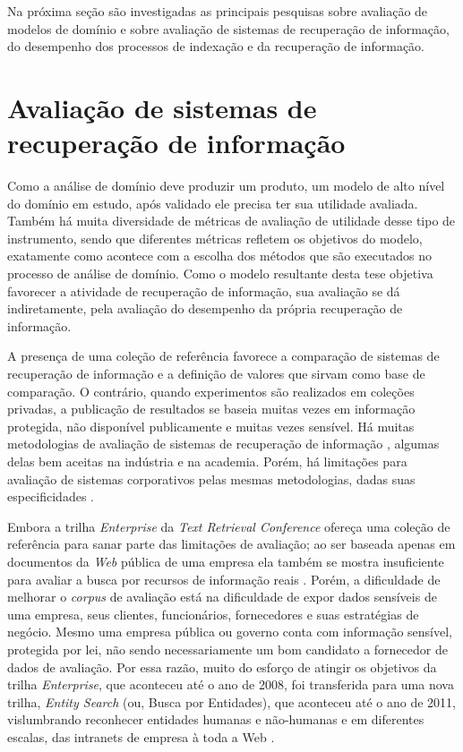 Na próxima seção são investigadas as principais pesquisas sobre avaliação de modelos de domínio e sobre avaliação de sistemas  de recuperação de informação, do desempenho dos processos de indexação e da recuperação de informação.


\section{Avaliação de sistemas de recuperação de informação}

Como a análise de domínio deve produzir um produto, um modelo de alto nível do domínio em estudo, após validado ele precisa ter sua utilidade avaliada. Também há muita diversidade de métricas de avaliação de utilidade desse tipo de instrumento, sendo que diferentes métricas refletem os objetivos do modelo, exatamente como acontece com a escolha dos métodos que são executados no processo de análise de domínio. Como o modelo resultante desta tese objetiva favorecer a atividade de recuperação de informação, sua avaliação se dá indiretamente, pela avaliação do desempenho da própria recuperação de informação.

A presença de uma coleção de referência favorece a comparação de sistemas de recuperação de informação e a definição de valores que sirvam como base de comparação. O contrário, quando experimentos são realizados em coleções privadas, a publicação de resultados se baseia muitas vezes em informação protegida, não disponível publicamente e muitas vezes sensível. Há muitas metodologias de avaliação de sistemas de recuperação de informação \cite{irEvaluation02,evaluationWithIncompleteInformation04,bucher05,sakai08ret,DBLP:conf/clef/2008}, algumas delas bem aceitas na indústria e na academia. Porém, há limitações para avaliação de sistemas corporativos pelas mesmas metodologias, dadas suas especificidades \cite{craswell05}.

Embora a trilha \textit{Enterprise} da \textit{Text Retrieval Conference} ofereça uma coleção de referência para sanar parte das limitações de avaliação; ao ser baseada apenas em documentos da \textit{Web} pública de uma empresa ela também se mostra insuficiente para avaliar a busca por recursos de informação reais \cite{bailey07}. Porém, a dificuldade de melhorar o \textit{corpus} de avaliação está na dificuldade de expor dados sensíveis de uma empresa, seus clientes, funcionários, fornecedores e suas estratégias de negócio. Mesmo uma empresa pública ou governo conta com informação sensível, protegida por lei, não sendo necessariamente um bom candidato a fornecedor de dados de avaliação. Por essa razão, muito do esforço de atingir os objetivos da trilha \textit{Enterprise}, que aconteceu até o ano de 2008, foi transferida para uma nova trilha, \textit{Entity Search} (ou, Busca por Entidades), que aconteceu até o ano de 2011, vislumbrando reconhecer entidades humanas e não-humanas e em diferentes escalas, das intranets de empresa à toda a Web \cite{balog08}.

